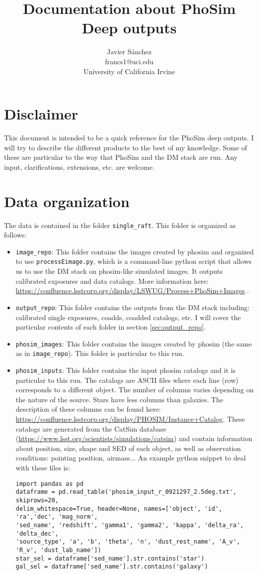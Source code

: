 \documentclass{article}
\author{Javier S\'{a}nchez \\ francs1@uci.edu \\ University of California Irvine}
\title{Documentation about PhoSim Deep outputs}
\begin{document}
\maketitle
\section{Disclaimer}
This document is intended to be a quick reference for the PhoSim deep outputs. I will try to describe the
different products to the best of my knowledge. Some of these are particular to the way that PhoSim and
the DM stack are run. Any input, clarifications, extensions, etc. are welcome.
\section{Data organization}
The data is contained in the folder \texttt{single\_raft}. This folder is organized as follows:
\begin{itemize}
\item \texttt{image\_repo}: This folder contains the images created by phosim and organized to use \texttt{processEimage.py}, which is a command-line python script that allows us to use the DM stack on phosim-like simulated images. It outputs calibrated exposures and data catalogs. More information here: \url{https://confluence.lsstcorp.org/display/LSWUG/Process+PhoSim+Images} .
\item \texttt{output\_repo}: This folder contains the outputs from the DM stack including: calibrated single exposures, coadds, coadded catalogs, etc. I will cover the particular contents of each folder in section \ref{sec:output_repo}.
\item \texttt{phosim\_images}: This folder contains the images created by phosim (the same as in \texttt{image\_repo}). This folder is particular to this run.
\item \texttt{phosim\_inputs}: This folder contains the input phosim catalogs and it is particular to this run. The catalogs are ASCII files where each line (row) corresponds to a different object. The number of columns varies depending on the nature of the source. Stars have less columns than galaxies. The description of these columns can be found here: \url{https://confluence.lsstcorp.org/display/PHOSIM/Instance+Catalog}. These catalogs are generated from the CatSim database (\url{https://www.lsst.org/scientists/simulations/catsim}) and contain information about position, size, shape and SED of each object, as well as observation conditions: pointing position, airmass... An example python snippet to deal with these files is:
\begin{verbatim}
import pandas as pd
dataframe = pd.read_table('phosim_input_r_0921297_2.5deg.txt', skiprows=20, 
delim_whitespace=True, header=None, names=['object', 'id', 'ra','dec', 'mag_norm',
'sed_name', 'redshift', 'gamma1', 'gamma2', 'kappa', 'delta_ra', 'delta_dec', 
'source_type', 'a', 'b', 'theta', 'n', 'dust_rest_name', 'A_v', 'R_v', 'dust_lab_name'])
star_sel = dataframe['sed_name'].str.contains('star')
gal_sel = dataframe['sed_name'].str.contains('galaxy')
\end{verbatim}
\end{itemize}
\end{document}
